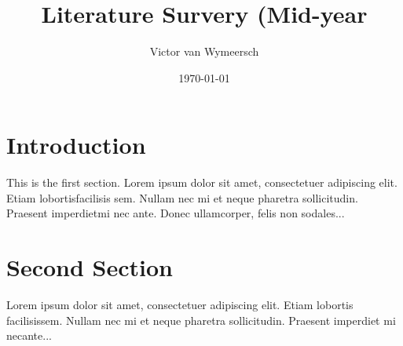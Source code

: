 \documentclass{article}
\title{Literature Survery (Mid-year}
\author{Victor van Wymeersch}
\date{\today}
\begin{document}
 
\maketitle
 
\section{Introduction}
 
This is the first section.
Lorem  ipsum  dolor  sit  amet,  consectetuer  adipiscing  
elit.   Etiam  lobortisfacilisis sem.  Nullam nec mi et 
neque pharetra sollicitudin.  Praesent imperdietmi nec ante. 
Donec ullamcorper, felis non sodales...
 
\section{Second Section}
 
Lorem ipsum dolor sit amet, consectetuer adipiscing elit.  
Etiam lobortis facilisissem.  Nullam nec mi et neque pharetra 
sollicitudin.  Praesent imperdiet mi necante...
 
\end{document}

